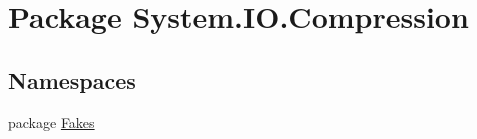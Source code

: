 \hypertarget{namespace_system_1_1_i_o_1_1_compression}{\section{Package System.\-I\-O.\-Compression}
\label{namespace_system_1_1_i_o_1_1_compression}
}
\subsection*{Namespaces}
\begin{DoxyCompactItemize}
\item 
package \hyperlink{namespace_system_1_1_i_o_1_1_compression_1_1_fakes}{Fakes}
\end{DoxyCompactItemize}
